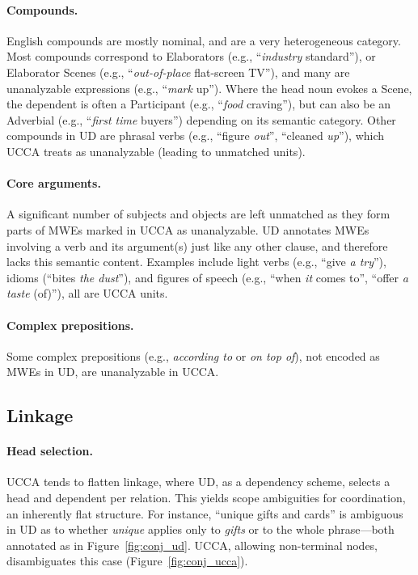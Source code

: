 \documentclass[11pt,a4paper,table]{article}
\begin{document}
\paragraph{Compounds.} English compounds are mostly nominal,
        and are a very heterogeneous category.
        Most compounds correspond to Elaborators (e.g., ``\textit{industry} standard''),
        or Elaborator Scenes (e.g., ``\textit{out-of-place} flat-screen TV''),
        and many are unanalyzable expressions (e.g., ``\textit{mark} up'').
        Where the head noun evokes a Scene, the dependent is often a Participant
        (e.g., ``\textit{food} craving''), but can also be an Adverbial 
        (e.g., ``\textit{first time} buyers'') depending on its semantic category.
        Other compounds in UD are phrasal verbs (e.g., ``figure \textit{out}'', ``cleaned \textit{up}''),
        which UCCA treats as unanalyzable (leading to unmatched units). 
            
\paragraph{Core arguments.}
      A significant number of subjects and objects are left unmatched as they
      form parts of MWEs marked in UCCA as unanalyzable. UD annotates
      MWEs involving a verb and its argument(s) just like any other clause, and therefore
      lacks this semantic content. Examples include light verbs (e.g., ``give {\it a try}''),
      idioms (``bites {\it the dust}''), and figures of speech (e.g., ``when \textit{it} comes to'', ``offer \textit{a taste} (of)''),
      all are UCCA units.
      
\paragraph{Complex prepositions.} Some complex prepositions (e.g., \textit{according to} or \textit{on top of}),
      not encoded as MWEs in UD, are unanalyzable in UCCA.


\subsection{Linkage}\label{sec:linkage}

\paragraph{Head selection.}
UCCA tends to flatten linkage, where UD, as a dependency scheme,
selects a head and dependent per relation.
This yields scope ambiguities for coordination, an inherently flat structure. 
For instance, ``unique gifts and cards'' is ambiguous in UD as to whether
\textit{unique} applies only to \textit{gifts} or to the whole phrase---both
annotated as in Figure~\ref{fig:conj_ud}.
UCCA, allowing non-terminal nodes, disambiguates this case (Figure~\ref{fig:conj_ucca}).
\end{document}
